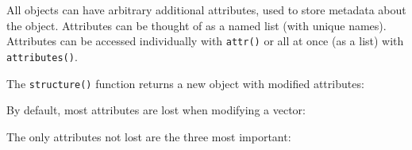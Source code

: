 
All objects can have arbitrary additional attributes, used to store
metadata about the object. Attributes can be thought of as a named list
(with unique names). Attributes can be accessed individually with
\texttt{attr()} or all at once (as a list) with \texttt{attributes()}.

\begin{Shaded}
\begin{Highlighting}[]
\StringTok{ }\NormalTok{:}
\NormalTok{) <-}
\NormalTok{)}
\NormalTok{(}
\end{Highlighting}
\end{Shaded}

The \texttt{structure()} function returns a new object with modified
attributes: 

\begin{Shaded}
\begin{Highlighting}[]
\NormalTok{(}\NormalTok{:}\NormalTok{, } \NormalTok{)}
\end{Highlighting}
\end{Shaded}

By default, most attributes are lost when modifying a vector:

\begin{Shaded}
\begin{Highlighting}[]
\NormalTok{(y[}\NormalTok{])}
\NormalTok{(}
\end{Highlighting}
\end{Shaded}

The only attributes not lost are the three most important:


